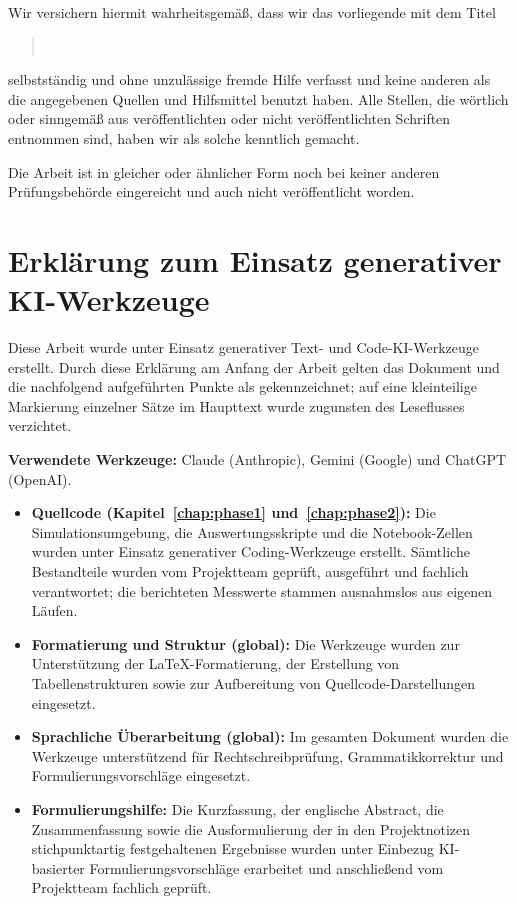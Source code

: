 
Wir versichern hiermit wahrheitsgemäß, dass wir das vorliegende \DocName{} mit dem Titel
\begin{quote}
  \textbf{\Title} \\
\end{quote}
selbstständig und ohne unzulässige fremde Hilfe verfasst und keine anderen als die angegebenen Quellen und Hilfsmittel benutzt haben. Alle Stellen, die wörtlich oder sinngemäß aus veröffentlichten oder nicht veröffentlichten Schriften entnommen sind, haben wir als solche kenntlich gemacht.

Die Arbeit ist in gleicher oder ähnlicher Form noch bei keiner anderen Prüfungsbehörde eingereicht und auch nicht veröffentlicht worden.

\section*{Erklärung zum Einsatz generativer KI-Werkzeuge}

Diese Arbeit wurde unter Einsatz generativer Text- und Code-\acs{KI}-Werkzeuge erstellt. Durch diese Erklärung am Anfang der Arbeit gelten das Dokument und die nachfolgend aufgeführten Punkte als gekennzeichnet; auf eine kleinteilige Markierung einzelner Sätze im Haupttext wurde zugunsten des Leseflusses verzichtet.

\textbf{Verwendete Werkzeuge:} Claude (Anthropic), Gemini (Google) und ChatGPT (OpenAI).

\begin{itemize}
  \item \textbf{Quellcode (Kapitel~\ref{chap:phase1} und~\ref{chap:phase2}):} Die Simulationsumgebung, die Auswertungsskripte und die Notebook-Zellen wurden unter Einsatz generativer Coding-Werkzeuge erstellt. Sämtliche Bestandteile wurden vom Projektteam geprüft, ausgeführt und fachlich verantwortet; die berichteten Messwerte stammen ausnahmslos aus eigenen Läufen.
  \item \textbf{Formatierung und Struktur (global):} Die Werkzeuge wurden zur Unterstützung der \LaTeX-Formatierung, der Erstellung von Tabellenstrukturen sowie zur Aufbereitung von Quellcode-Darstellungen eingesetzt.
  \item \textbf{Sprachliche Überarbeitung (global):} Im gesamten Dokument wurden die Werkzeuge unterstützend für Rechtschreibprüfung, Grammatikkorrektur und Formulierungsvorschläge eingesetzt.
  \item \textbf{Formulierungshilfe:} Die Kurzfassung, der englische Abstract, die Zusammenfassung sowie die Ausformulierung der in den Projektnotizen stichpunktartig festgehaltenen Ergebnisse wurden unter Einbezug KI-basierter Formulierungsvorschläge erarbeitet und anschließend vom Projektteam fachlich geprüft.
\end{itemize}

